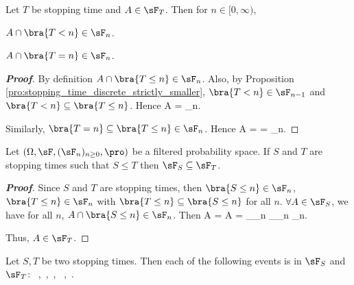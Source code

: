 \begin{proposition}
Let $T$ be stopping time and $A\in \sF_T$. Then for $n\in [0,\infty)$,
\ben
\item [(i)] $A\cap \bra{T<n} \in \sF_n$.
\item [(ii)] $A\cap \bra{T=n}\in \sF_n$.
\een
\end{proposition}

\begin{proof}[\bf Proof]
\ben
\item [(i)] By definition $A\cap \bra{T\leq n} \in \sF_n$. Also, by Proposition \ref{pro:stopping_time_discrete_strictly_smaller}, $\bra{T<n}\in \sF_{n-1}$ and $\bra{T<n}\subseteq \bra{T\leq n}$. Hence
\be
A\cap {} = \cap {} \in \sF_n.
\ee

\item [(ii)] Similarly, $\bra{T=n} \subseteq \bra{T\leq n} \in \sF_n$. Hence
\be
A\cap {} =  \cap {} =  \cap {} \in \sF_n.
\ee
\een
\end{proof}



\begin{proposition}\label{pro:sigma_algebra_stopping_time_increasing}
Let $(\Omega,\sF, (\sF_n)_{n\geq 0},\pro)$ be a filtered probability space. If $S$ and $T$ are stopping times such that $S \leq T$ then $\sF_S \subseteq \sF_T$.
\end{proposition}

\begin{proof}[\bf Proof]
Since $S$ and $T$ are stopping times, then $\bra{S \leq n}\in \sF_n$, $\bra{T \leq n}\in \sF_n$ with $\bra{T\leq n} \subseteq \bra{S\leq n}$ for all $n$. $\forall A \in \sF_S$, we have for all $n$, $A \cap \bra{S \leq n} \in \sF_n$. Then
\be
A \cap {} = A \cap {} = _{\in \sF_n} \cap {}_{\in \sF_n} \in \sF_n.
\ee

Thus, $A\in \sF_T$.
\end{proof}



\begin{proposition}
Let $S,T$ be two stopping times. Then each of the following events is in $\sF_S$ and $\sF_T$:
\be
{}\ ,\quad{}\ ,\quad {}\ , \quad {}\  ,\quad{}\ .
\ee
\end{proposition}

